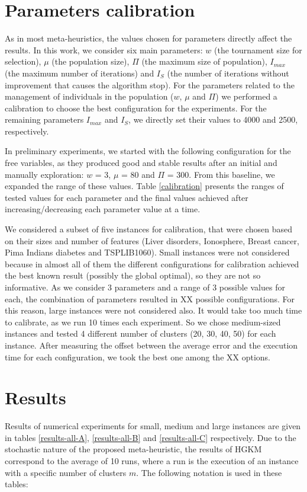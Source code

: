 \section{Parameters calibration}
\label{sec:calibration}
As in most meta-heuristics, the values chosen for parameters directly affect the results. In this work, we consider six main parameters: $w$ (the tournament size for selection), $\mu$ (the population size), $\Pi$ (the maximum size of population), $I_{max}$ (the maximum number of iterations) and $I_S$ (the number of iterations without improvement that causes the algorithm stop). For the parameters related to the management of individuals in the population ($w$, $\mu$ and $\Pi$) we performed a calibration to choose the best configuration for the experiments. For the remaining parameters $I_{max}$ and $I_S$, we directly set their values to 4000 and 2500, respectively.

In preliminary experiments, we started with the following configuration for the free variables, as they produced good and stable results after an initial and manually exploration: $w$ = 3, $\mu$ = 80 and $\Pi$ = 300. From this baseline, we expanded the range of these values. Table \ref{calibration} presents the ranges of tested values for each parameter and the final values achieved after increasing/decreasing each parameter value at a time.

We considered a subset of five instances for calibration, that were chosen based on their sizes and number of features (Liver disorders, Ionosphere, Breast cancer, Pima Indians diabetes and TSPLIB1060). Small instances were not considered because in almost all of them the different configurations for calibration achieved the best known result (possibly the global optimal), so they are not so informative. As we consider 3 parameters and a range of 3 possible values for each, the combination of parameters resulted in XX possible configurations. For this reason, large instances were not considered also. It would take too much time to calibrate, as we run 10 times each experiment. So we chose medium-sized instances and tested 4 different number of clusters (20, 30, 40, 50) for each instance. After measuring the offset between the average error and the execution time for each configuration, we took the best one among the XX options.





\section{Results}
\label{sec:results}
Results of numerical experiments for small, medium and large instances are given in tables \ref{results-all-A}, \ref{results-all-B} and \ref{results-all-C} respectively. Due to the stochastic nature of the proposed meta-heuristic, the results of HGKM correspond to the average of 10 runs, where a run is the execution of an instance with a specific number of clusters $m$. The following notation is used in these tables:

